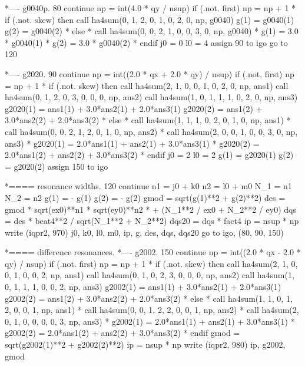*---- g0040p.
   80 continue
      np = int(4.0 * qy / nsup)
      if (.not. first) np = np + 1
*     if (.not. skew) then
        call ha4sum(0, 1, 2, 0, 1, 0, 2, 0, np, g0040)
        g(1) = g0040(1)
        g(2) = g0040(2)
*     else
*       call ha4sum(0, 0, 2, 1, 0, 0, 3, 0, np, g0040)
*       g(1) = 3.0 * g0040(1)
*       g(2) = 3.0 * g0040(2)
*     endif
      j0 = 0
      l0 = 4
      assign 90 to igo
      go to 120
 
*---- g2020.
   90 continue
      np = int((2.0 * qx + 2.0 * qy) / nsup)
      if (.not. first) np = np + 1
*     if (.not. skew) then
        call ha4sum(2, 1, 0, 0, 1, 0, 2, 0, np, ans1)
        call ha4sum(0, 1, 2, 0, 3, 0, 0, 0, np, ans2)
        call ha4sum(1, 0, 1, 1, 1, 0, 2, 0, np, ans3)
        g2020(1) = ans1(1) + 3.0*ans2(1) + 2.0*ans3(1)
        g2020(2) = ans1(2) + 3.0*ans2(2) + 2.0*ans3(2)
*     else
*       call ha4sum(1, 1, 1, 0, 2, 0, 1, 0, np, ans1)
*       call ha4sum(0, 0, 2, 1, 2, 0, 1, 0, np, ans2)
*       call ha4sum(2, 0, 0, 1, 0, 0, 3, 0, np, ans3)
*       g2020(1) = 2.0*ans1(1) + ans2(1) + 3.0*ans3(1)
*       g2020(2) = 2.0*ans1(2) + ans2(2) + 3.0*ans3(2)
*     endif
      j0 = 2
      l0 = 2
      g(1) = g2020(1)
      g(2) = g2020(2)
      assign 150 to igo
 
*==== resonance widths.
  120 continue
      n1 = j0 + k0
      n2 = l0 + m0
      N_1 = n1
      N_2 = n2
      g(1) = - g(1)
      g(2) = - g(2)
      gmod = sqrt(g(1)**2 + g(2)**2)
      des = gmod * sqrt(ex0)**n1 * sqrt(ey0)**n2 *
     +      (N_1**2 / ex0 + N_2**2 / ey0)
      dqs = des * beat4**2 / sqrt(N_1**2 + N_2**2)
      dqs20 = dqs * fact4
      ip = nsup * np
      write (iqpr2, 970) j0, k0, l0, m0, ip, g, des, dqs, dqs20
      go to igo, (80, 90, 150)
 
*==== difference resonances.
*---- g2002.
  150 continue
      np = int((2.0 * qx - 2.0 * qy) / nsup)
      if (.not. first) np = np + 1
*     if (.not. skew) then
        call ha4sum(2, 1, 0, 0, 1, 0, 0, 2, np, ans1)
        call ha4sum(0, 1, 0, 2, 3, 0, 0, 0, np, ans2)
        call ha4sum(1, 0, 1, 1, 1, 0, 0, 2, np, ans3)
        g2002(1) = ans1(1) + 3.0*ans2(1) + 2.0*ans3(1)
        g2002(2) = ans1(2) + 3.0*ans2(2) + 2.0*ans3(2)
*     else
*       call ha4sum(1, 1, 0, 1, 2, 0, 0, 1, np, ans1)
*       call ha4sum(0, 0, 1, 2, 2, 0, 0, 1, np, ans2)
*       call ha4sum(2, 0, 1, 0, 0, 0, 0, 3, np, ans3)
*       g2002(1) = 2.0*ans1(1) + ans2(1) + 3.0*ans3(1)
*       g2002(2) = 2.0*ans1(2) + ans2(2) + 3.0*ans3(2)
*     endif
      gmod = sqrt(g2002(1)**2 + g2002(2)**2)
      ip = nsup * np
      write (iqpr2, 980) ip, g2002, gmod
 
